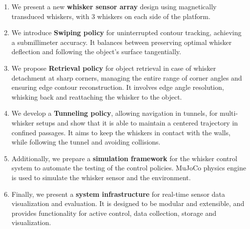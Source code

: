 \begin{enumerate}
    \item We present a new \textbf{whisker sensor array} design using magnetically transduced whiskers, with 3 whiskers on each side of the platform.
    \item We introduce \textbf{Swiping policy} for uninterrupted contour tracking, achieving a submillimeter accuracy.
    It balances between preserving optimal whisker deflection and following the object's surface tangentially.
    \item We propose \textbf{Retrieval policy} for object retrieval in case of whisker detachment at sharp corners, managing the entire range of corner angles and ensuring edge contour reconstruction.
    It involves edge angle resolution, whisking back and reattaching the whisker to the object.
    \item We develop a \textbf{Tunneling policy}, allowing navigation in tunnels, for multi-whisker setups and show that it is able to maintain a centered trajectory in confined passages.
    It aims to keep the whiskers in contact with the walls, while following the tunnel and avoiding collisions.
    \item Additionally, we prepare a \textbf{simulation framework} for the whisker control system to automate the testing of the control policies.
    MuJoCo physics engine is used to simulate the whisker sensor and the environment.
    \item Finally, we present a \textbf{system infrastructure} for real-time sensor data visualization and evaluation.
    It is designed to be modular and extensible, and provides functionality for active control, data collection, storage and visualization.
\end{enumerate}
